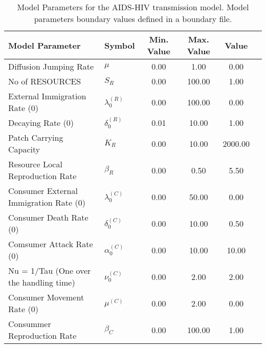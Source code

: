 \begin{table}
\centering
\begin{tabular}{p{5cm}lcccc}
{\bf Model Parameter} & {\bf Symbol} & {\bf Min. Value} & {\bf Max. Value} & {\bf Value}\\
\hline\hline
Diffusion Jumping Rate & $\mu$ & 0.00 & 1.00 & 0.00\\
No of RESOURCES & $S_R$ & 0.00 & 100.00 & 1.00\\
External Immigration Rate (0) & $\lambda^{(R)}_0$ & 0.00 & 100.00 & 0.00\\
Decaying Rate (0) & $\delta^{(R)}_0$ & 0.01 & 10.00 & 1.00\\
Patch Carrying Capacity & $K_R$ & 0.00 & 10.00 & 2000.00\\
Resource Local Reproduction Rate & $\beta_R$ & 0.00 & 0.50 & 5.50\\
Consumer External Immigration Rate (0) & $\lambda^{(C)}_0$ & 0.00 & 50.00 & 0.00\\
Consumer Death Rate (0) & $\delta^{(C)}_0$ & 0.00 & 10.00 & 0.50\\
Comsumer Attack Rate (0) & $\alpha^{(C)}_0$ & 0.00 & 10.00 & 10.00\\
Nu = 1/Tau (One over the handling time) & $\nu^{(C)}_0$ & 0.00 & 2.00 & 2.00\\
Consumer Movement Rate (0) & $\mu^{(C)}$ & 0.00 & 2.00 & 0.00\\
Consummer Reproduction Rate & $\beta_C$ & 0.00 & 100.00 & 1.00\\
\hline\hline
\end{tabular}
\caption{Model Parameters for the AIDS-HIV transmission model. Model parameters boundary values defined in a boundary file.}
\end{table}
